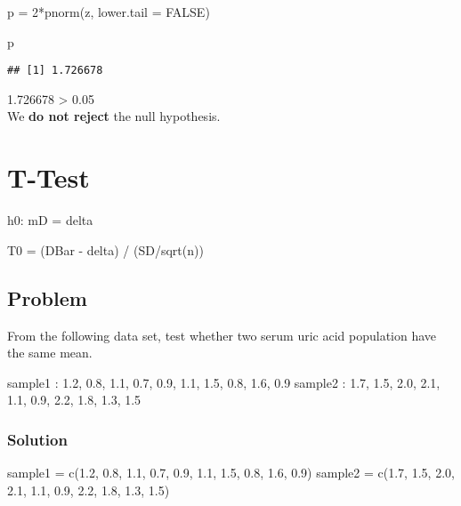 \documentclass[
]{article}
\newenvironment{Shaded}{\begin{snugshade}}{\end{snugshade}}
\newcommand{\AttributeTok}[1]{\textcolor[rgb]{0.77,0.63,0.00}{#1}}
\newcommand{\ConstantTok}[1]{\textcolor[rgb]{0.00,0.00,0.00}{#1}}
\newcommand{\DecValTok}[1]{\textcolor[rgb]{0.00,0.00,0.81}{#1}}
\newcommand{\FloatTok}[1]{\textcolor[rgb]{0.00,0.00,0.81}{#1}}
\newcommand{\FunctionTok}[1]{\textcolor[rgb]{0.00,0.00,0.00}{#1}}
\newcommand{\NormalTok}[1]{#1}
\newcommand{\OtherTok}[1]{\textcolor[rgb]{0.56,0.35,0.01}{#1}}
\newcommand{\SpecialCharTok}[1]{\textcolor[rgb]{0.00,0.00,0.00}{#1}}
\begin{document}
\begin{Shaded}
\begin{Highlighting}[]
\NormalTok{p }\OtherTok{=} \DecValTok{2}\SpecialCharTok{*}\FunctionTok{pnorm}\NormalTok{(z, }\AttributeTok{lower.tail =} \ConstantTok{FALSE}\NormalTok{)}

\NormalTok{p}
\end{Highlighting}
\end{Shaded}

\begin{verbatim}
## [1] 1.726678
\end{verbatim}

1.726678 \textgreater{} 0.05\\
We \textbf{do not reject} the null hypothesis.

\hypertarget{t-test}{%
\section{T-Test}\label{t-test}}

h0: mD = delta

T0 = (DBar - delta) / (SD/sqrt(n))

\hypertarget{problem-19}{%
\subsection{Problem}\label{problem-19}}

From the following data set, test whether two serum uric acid population
have the same mean.

sample1 : 1.2, 0.8, 1.1, 0.7, 0.9, 1.1, 1.5, 0.8, 1.6, 0.9 sample2 :
1.7, 1.5, 2.0, 2.1, 1.1, 0.9, 2.2, 1.8, 1.3, 1.5

\hypertarget{solution-20}{%
\subsubsection{Solution}\label{solution-20}}

\begin{Shaded}
\begin{Highlighting}[]
\NormalTok{sample1 }\OtherTok{=} \FunctionTok{c}\NormalTok{(}\FloatTok{1.2}\NormalTok{, }\FloatTok{0.8}\NormalTok{, }\FloatTok{1.1}\NormalTok{, }\FloatTok{0.7}\NormalTok{, }\FloatTok{0.9}\NormalTok{, }\FloatTok{1.1}\NormalTok{, }\FloatTok{1.5}\NormalTok{, }\FloatTok{0.8}\NormalTok{, }\FloatTok{1.6}\NormalTok{, }\FloatTok{0.9}\NormalTok{)}
\NormalTok{sample2 }\OtherTok{=} \FunctionTok{c}\NormalTok{(}\FloatTok{1.7}\NormalTok{, }\FloatTok{1.5}\NormalTok{, }\FloatTok{2.0}\NormalTok{, }\FloatTok{2.1}\NormalTok{, }\FloatTok{1.1}\NormalTok{, }\FloatTok{0.9}\NormalTok{, }\FloatTok{2.2}\NormalTok{, }\FloatTok{1.8}\NormalTok{, }\FloatTok{1.3}\NormalTok{, }\FloatTok{1.5}\NormalTok{)}
\end{Highlighting}
\end{Shaded}
\end{document}

